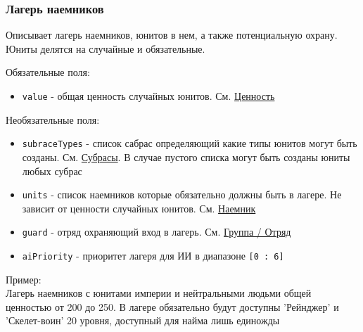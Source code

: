\subsubsection{Лагерь наемников}
\label{mercenary}
Описывает лагерь наемников, юнитов в нем, а также потенциальную охрану. Юниты делятся на случайные и обязательные.

Обязательные поля:
\begin{itemize}
\item \texttt{value} - общая ценность случайных юнитов. См. \hyperref[value]{Ценность}
\end{itemize}

Необязательные поля:
\begin{itemize}
\item \texttt{subraceTypes} - список сабрас определяющий какие типы юнитов могут быть созданы. См. \hyperref[subraceTypes]{Субрасы}. В случае пустого списка могут быть созданы юниты любых субрас
\item \texttt{units} - список наемников которые обязательно должны быть в лагере. Не зависит от ценности случайных юнитов. См. \hyperref[mercenaryUnit]{Наемник}
\item \texttt{guard} - отряд охраняющий вход в лагерь. См. \hyperref[group]{Группа / Отряд}
\item \texttt{aiPriority} - приоритет лагеря для ИИ в диапазоне \texttt{[0 : 6]}
\end{itemize}

Пример:\\
Лагерь наемников с юнитами империи и нейтральными людьми общей ценностью от 200 до 250.
В лагере обязательно будут доступны 'Рейнджер' и 'Скелет-воин' 20 уровня, доступный для найма лишь единожды

\begin{figure}[H]

\end{figure}